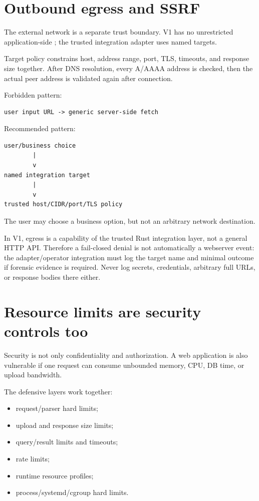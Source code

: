 \section{Outbound egress and SSRF}

The external network is a separate trust boundary. V1 has no unrestricted application-side ; the trusted integration adapter uses named targets.

Target policy constrains host, address range, port, TLS, timeouts, and response size together. After DNS resolution, every A/AAAA address is checked, then the actual peer address is validated again after connection.

Forbidden pattern:

\begin{lstlisting}
user input URL -> generic server-side fetch
\end{lstlisting}

Recommended pattern:

\begin{lstlisting}
user/business choice
        |
        v
named integration target
        |
        v
trusted host/CIDR/port/TLS policy
\end{lstlisting}

The user may choose a business option, but not an arbitrary network destination.

In V1, egress is a capability of the trusted Rust integration layer, not a general  HTTP API. Therefore a fail-closed  denial is not automatically a webserver  event: the adapter/operator integration must log the target name and minimal outcome if forensic evidence is required. Never log secrets, credentials, arbitrary full URLs, or response bodies there either.

\section{Resource limits are security controls too}

Security is not only confidentiality and authorization. A web application is also vulnerable if one request can consume unbounded memory, CPU, DB time, or upload bandwidth.

The defensive layers work together:

\begin{itemize}
  \item request/parser hard limits;
  \item upload and response size limits;
  \item query/result limits and timeouts;
  \item rate limits;
  \item runtime resource profiles;
  \item process/systemd/cgroup hard limits.
\end{itemize}

